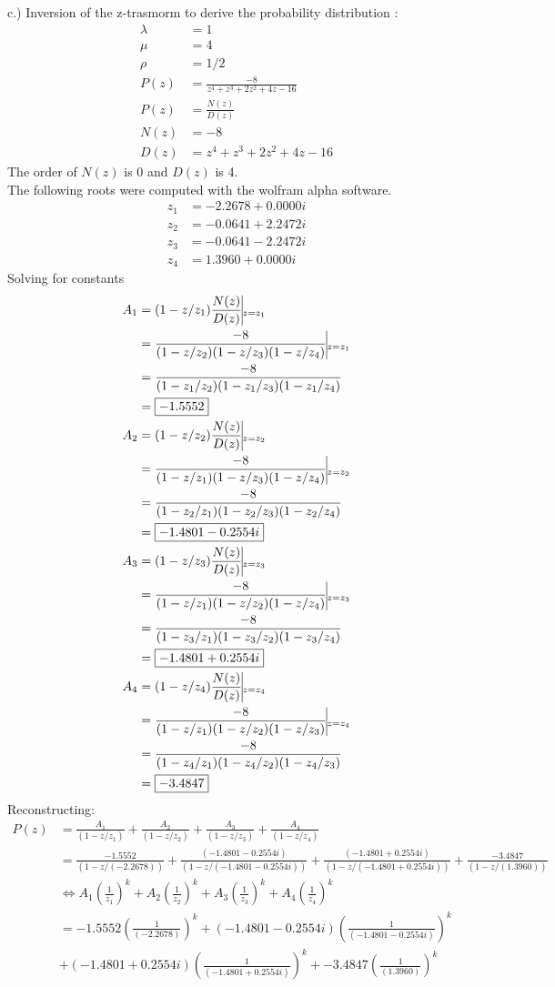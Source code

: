 \documentclass[fleqn]{article}
\newcommand{\nn}[1]{ \begin{align*}#1\end{align*}}
\begin{document}
c.) Inversion of the z-trasmorm to derive the probability distribution : 
\nn{
	\lambda 	&= 1										\\
	\mu 		&= 4										\\
	\rho		&= 1/2										\\
	P(z)		&= \frac{-8}{z^4 + z^3 + 2z^2 + 4z - 16}	\\
	P(z)		&= \frac{N(z)}{D(z)}						\\
	N(z)		&= -8										\\
	D(z)		&= z^4 + z^3 + 2z^2 + 4z - 16
}
The order of $N(z)$ is 0 and $D(z)$ is 4.\\
The following roots were computed with the wolfram alpha software. 
\nn{
	z_1 &=  -2.2678 + 0.0000i \\
  	z_2 &=  -0.0641 + 2.2472i \\
  	z_3 &=  -0.0641 - 2.2472i \\
    z_4 &=   1.3960 + 0.0000i
}
Solving for constants
\nn{
	A_1 	&= (1-z/z_1)\frac{N(z)}{D(z)}\vline_{z=z_1}\\
			&= \frac{-8}{(1-z/z_2)(1-z/z_3)(1-z/z_4)}\vline_{z=z_1}\\
			&= \frac{-8}{(1- z_1/z_2)(1- z_1/z_3)(1- z_1/z_4)}\\
			&= \boxed{ -1.5552 }\\
	A_2		&= (1-z/z_2)\frac{N(z)}{D(z)}\vline_{z=z_2}\\
			&= \frac{-8}{(1-z/z_1)(1-z/z_3)(1-z/z_4)}\vline_{z=z_2}\\
			&= \frac{-8}{(1- z_2/z_1)(1- z_2/z_3)(1- z_2/z_4)}\\
			&= \boxed{ -1.4801 - 0.2554i }\\
	A_3 	&= (1-z/z_3)\frac{N(z)}{D(z)}\vline_{z=z_3}\\
			&= \frac{-8}{(1-z/z_1)(1-z/z_2)(1-z/z_4)}\vline_{z=z_3}\\
			&= \frac{-8}{(1- z_3/z_1)(1- z_3/z_2)(1- z_3/z_4)}\\
			&= \boxed{ -1.4801 + 0.2554i }\\
	A_4		&= (1-z/z_4)\frac{N(z)}{D(z)}\vline_{z=z_4}\\
			&= \frac{-8}{(1-z/z_1)(1-z/z_2)(1-z/z_3)}\vline_{z=z_4}\\
			&= \frac{-8}{(1- z_4/z_1)(1- z_4/z_2)(1- z_4/z_3)}\\
			&= \boxed{ -3.4847 }\\
}
Reconstructing:
\nn{
	P(z) &= \frac{A_1}{(1 - z/z_1)} 
	      + \frac{A_2}{(1 - z/z_2)} 
	      + \frac{A_3}{(1 - z/z_3)}
	      + \frac{A_4}{(1 - z/z_4)}\\
	     &= \frac{-1.5552}{(1 - z/(-2.2678))} 
	      + \frac{(-1.4801 - 0.2554i)}{(1 - z/(-1.4801 - 0.2554i))} 
	      + \frac{(-1.4801 + 0.2554i)}{(1 - z/(-1.4801 + 0.2554i))}
	      + \frac{-3.4847}{(1 - z/(1.3960))}\\
	     &\Longleftrightarrow 
	      A_1\left(\frac{1}{z_1}\right)^k
	      + A_2\left(\frac{1}{z_2}\right)^k
	      + A_3\left(\frac{1}{z_3}\right)^k
	      + A_4\left(\frac{1}{z_4}\right)^k\\
	     &= -1.5552\left(\frac{1}{(-2.2678)}\right)^k
	      + (-1.4801 - 0.2554i)\left(\frac{1}{(-1.4801 - 0.2554i)}\right)^k\\
	     &+ (-1.4801 + 0.2554i)\left(\frac{1}{(-1.4801 + 0.2554i)}\right)^k
	      + -3.4847\left(\frac{1}{(1.3960)}\right)^k
}
\end{document}
